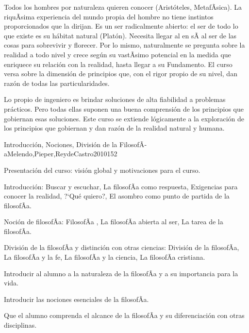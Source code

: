 \begin{syllabus}


\begin{justification}
Todos los hombres por naturaleza quieren conocer  (Aristóteles, MetafÃ­sica). La riquÃ­sima experiencia del mundo propia del hombre no tiene instintos proporcionados que la dirijan. Es un ser radicalmente abierto: el ser de todo lo que existe es su  hábitat  natural (Platón). Necesita llegar al  en sÃ­ al ser de las cosas para sobrevivir y florecer. Por lo mismo, naturalmente se pregunta sobre la realidad a todo nivel y crece según su vastÃ­simo potencial en la medida que enriquece su relación con la realidad, hasta llegar a su Fundamento. El curso versa sobre la dimensión de principios que, con el rigor propio de su nivel, dan razón de todas las particularidades.
\end{justification}

\begin{goals}
\item Lo propio de ingeniero es brindar soluciones de alta fiabilidad a problemas prácticos. Pero todas ellas suponen una buena comprensión de los principios que gobiernan esas soluciones. Este curso se extiende lógicamente a la exploración de los principios que gobiernan y dan razón de la realidad natural y humana.
\end{goals}

\begin{outcomes}
\end{outcomes}

\begin{unit}{Introducción, Nociones, División de la FilosofÃ­a}{Melendo,Pieper,ReydeCastro2010}{15}{2}
\begin{topics}
	\item Presentación del curso: visión global y motivaciones para el curso.
	\item Introducción: Buscar y escuchar, La filosofÃ­a como respuesta, Exigencias para conocer la realidad, ?`Qué quiero?, El asombro como punto de partida de la filosofÃ­a.
	\item Noción de filosofÃ­a:  FilosofÃ­a , La filosofÃ­a abierta al ser, La tarea de la filosofÃ­a.
	\item División de la filosofÃ­a y distinción con otras ciencias: División de la filosofÃ­a, La filosofÃ­a y la fe, La filosofÃ­a y la ciencia,  La filosofÃ­a cristiana.
\end{topics}
\begin{unitgoals}
	\item Introducir al alumno a la naturaleza de la filosofÃ­a y a su importancia para la vida.
	\item Introducir las nociones esenciales de la filosofÃ­a.
	\item Que el alumno comprenda el alcance de la filosofÃ­a y su diferenciación con otras disciplinas.
\end{unitgoals}
\end{unit}


\end{syllabus}

